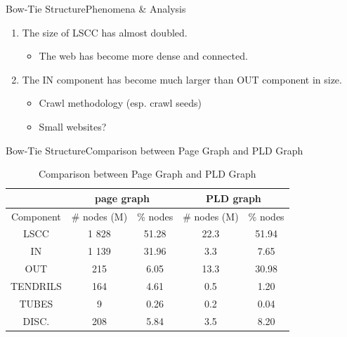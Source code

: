\documentclass{beamer}
\begin{document}
  \begin{frame}{Bow-Tie Structure}{Phenomena \& Analysis}
    \begin{enumerate}[1]
      \item The size of LSCC has almost doubled.
      \pause
      \begin{itemize}
        \item The web has become more dense and connected.
      \end{itemize}
      \pause
      \item The IN component has become much larger than OUT component in size.
      \pause
      \begin{itemize}
        \item Crawl methodology (esp. crawl seeds)
        \item Small websites?
      \end{itemize}
    \end{enumerate}
  \end{frame}

  \begin{frame}{Bow-Tie Structure}{Comparison between Page Graph and PLD Graph}
    \begin{center}
    \begin{table}
    \begin{tabular}{|c|c|c|c|c|}
      \hline
        &  \multicolumn{2}{c|}{page graph}  &  \multicolumn{2}{c|}{PLD graph}  \\ \hline
      Component & \# nodes (M) & \% nodes &  \# nodes (M) & \% nodes \\ \hline
      LSCC & 1 828 & 51.28 & 22.3 & 51.94    \\
      IN & 1 139 & 31.96 & 3.3 & 7.65   \\
      OUT & 215 & 6.05 & 13.3 & 30.98  \\
      TENDRILS & 164 & 4.61 & 0.5 & 1.20  \\
      TUBES & 9 & 0.26 & 0.2 & 0.04 \\
      DISC. & 208 & 5.84 & 3.5 & 8.20 \\ \hline
    \end{tabular}
    \caption{Comparison between Page Graph and PLD Graph}
    \end{table}
    \end{center}
  \end{frame}
\end{document}

